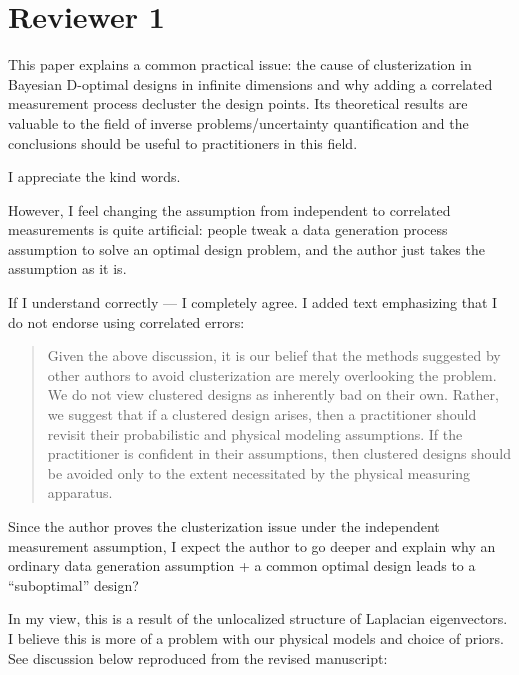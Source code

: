 \section{Reviewer 1}\label{ref1}
\RC This paper explains a common practical issue: the cause of
clusterization in Bayesian D-optimal designs in infinite dimensions
and why adding a correlated measurement process decluster the design
points. Its theoretical results are valuable to the field of inverse
problems/uncertainty quantification and the conclusions should be
useful to practitioners in this field.

\AR I appreciate the kind words.


\RC However, I feel changing the assumption from independent to correlated
measurements is quite artificial: people tweak a data generation
process assumption to solve an optimal design problem, and the author
just takes the assumption as it is.

\AR If I understand correctly --- I completely agree. I added text
emphasizing that I do not endorse using correlated errors:

\begin{quote}
  Given the above discussion, it is our belief that the methods
  suggested by other authors to avoid clusterization are merely
  overlooking the problem. We do not view clustered designs as
  inherently bad on their own. Rather, we suggest that if a clustered
  design arises, then a practitioner should revisit their probabilistic
  and physical modeling assumptions. If the practitioner is confident in
  their assumptions, then clustered designs should be avoided only to
  the extent necessitated by the physical measuring apparatus.
\end{quote}

\RC Since the author proves the clusterization issue under the independent
measurement assumption, I expect the author to go deeper and explain
why an ordinary data generation assumption + a common optimal design
leads to a “suboptimal” design?

\AR In my view, this is a result of the unlocalized structure of
Laplacian eigenvectors. I believe this is more of a problem with our
physical models and choice of priors. See discussion below reproduced
from the revised manuscript:

